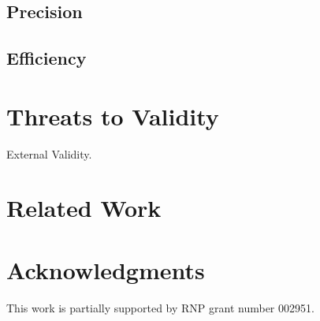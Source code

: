 \documentclass[runningheads]{llncs}
\begin{document}

\subsection{Precision}


\subsection{Efficiency}


\section{Threats to Validity}

External Validity. 

\section{Related Work}


\section*{Acknowledgments}
This work is partially supported by RNP grant number 002951.


%
%
%


%
\end{document}
